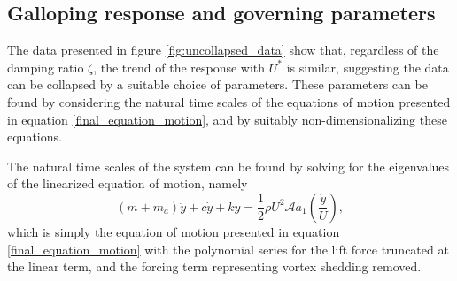 \subsection{Galloping response and governing parameters}
 
 

The data presented in figure \ref{fig:uncollapsed_data} show that, regardless of the damping ratio $\zeta$, the trend of the response with $U^*$ is similar, suggesting the data can be collapsed by a suitable choice of parameters. These parameters can be found by considering the natural time scales of the equations of motion presented in equation \ref{final_equation_motion}, and by suitably non-dimensionalizing these equations.

The natural time scales of the system can be found by solving for the eigenvalues of the linearized equation of motion, namely
\begin{equation}
\label{eqn:eom_linear}
(m{+}m_a)\ddot{y}{+}c\dot{y}{+}ky{=}\frac{1}{2}\rho U^2 \mathcal{A} a_1\left(\frac{\dot{y}}{U}\right),
\end{equation}
which is simply the equation of motion presented in equation \ref{final_equation_motion} with the polynomial series for the lift force truncated at the linear term, and the forcing term representing vortex shedding removed.

